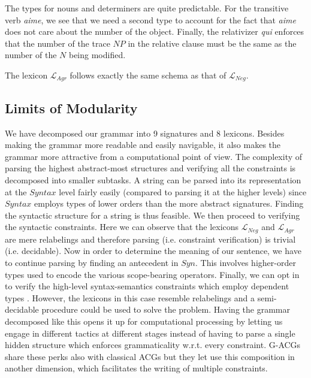 \documentclass{llncs}
\begin{document}
The types for nouns and determiners are quite predictable. For the transitive
verb \emph{aime}, we see that we need a second type to account for the fact
that \emph{aime} does not care about the number of the object. Finally, the
relativizer \emph{qui} enforces that the number of the trace $NP$ in the
relative clause must be the same as the number of the $N$ being modified.

The lexicon $\mathcal{L}_{Agr}$ follows exactly the same schema as that of
$\mathcal{L}_{Neg}$.

\subsection{Limits of Modularity}

We have decomposed our grammar into 9 signatures and 8 lexicons. Besides
making the grammar more readable and easily navigable, it also makes the
grammar more attractive from a computational point of view. The complexity of
parsing the highest abstract-most structures and verifying all the constraints
is decomposed into smaller subtasks. A string can be parsed into its
representation at the $Syntax$ level fairly easily (compared to parsing it at
the higher levels) since $Syntax$ employs types of lower orders than the more
abstract signatures. Finding the syntactic structure for a string is thus
feasible. We then proceed to verifying the syntactic constraints. Here we can
observe that the lexicons $\mathcal{L}_{Neg}$ and $\mathcal{L}_{Agr}$ are mere
relabelings and therefore parsing (i.e. constraint verification) is trivial
(i.e. decidable). Now in order to determine the meaning of our sentence, we
have to continue parsing by finding an antecedent in $Syn$. This involves
higher-order types used to encode the various scope-bearing
operators. Finally, we can opt in to verify the high-level syntax-semantics
constraints which employ dependent types
\cite{pogodalla2012controlling}. However, the lexicons in this case resemble
relabelings and a semi-decidable procedure could be used to solve the
problem. Having the grammar decomposed like this opens it up for computational
processing by letting us engage in different tactics at different stages
instead of having to parse a single hidden structure which enforces
grammaticality w.r.t. every constraint. G-ACGs share these perks also with
classical ACGs but they let use this composition in another dimension, which
facilitates the writing of multiple constraints.
\end{document}
